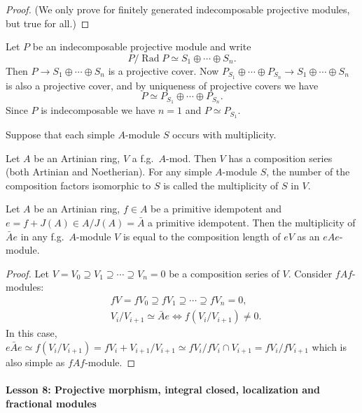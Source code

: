 \documentclass[11pt, a4paper]{report}
\begin{document}
\begin{proof}
(We only prove for finitely generated indecomposable projective modules, but true for all.)
\end{proof}
Let $P$ be an indecomposable projective module and write
\[
P / \operatorname{Rad} P \simeq S_{1} \oplus \cdots \oplus S_{n}.
\]
Then $P \rightarrow S_{1} \oplus \cdots \oplus S_{n}$ is a projective cover. Now $P_{S_{1}} \oplus \cdots \oplus P_{S_{n}} \rightarrow S_{1} \oplus \cdots \oplus S_{n}$ is also a projective cover, and by uniqueness of projective covers we have
\[
P \simeq P_{S_{1}} \oplus \cdots \oplus P_{S_{n}}.
\]
Since $P$ is indecomposable we have $n=1$ and $P \simeq P_{S_{1}}$.

Suppose that each simple $A$-module $S$ occurs with multiplicity.

Let $A$ be an Artinian ring, $V$ a f.g.\ $A$-mod. Then $V$ has a composition series (both Artinian and Noetherian). For any simple $A$-module $S$, the number of the composition factors isomorphic to $S$ is called the multiplicity of $S$ in $V$.

\begin{theorem}
Let $A$ be an Artinian ring, $f \in A$ be a primitive idempotent and $e=f+J(A) \in A / J(A)=\bar{A}$ a primitive idempotent. Then the multiplicity of $\bar{A} e$ in any f.g.\ $A$-module $V$ is equal to the composition length of $eV$ as an $eAe$-module.
\end{theorem}

\begin{proof}
Let $V=V_{0} \supseteq V_{1} \supseteq \cdots \supseteq V_{n}=0$ be a composition series of $V$. Consider $fAf$-modules:
\[
\begin{aligned}
& f V=f V_{0} \supseteq f V_{1} \supseteq \cdots \supseteq f V_{n}=0, \\
& V_{i} / V_{i+1} \simeq \bar{A} e \Leftrightarrow f\left(V_{i} / V_{i+1}\right) \neq 0.
\end{aligned}
\]
In this case, $e \bar{A} e \simeq f\left(V_{i} / V_{i+1}\right)=f V_{i}+V_{i+1} / V_{i+1} \simeq f V_{i} / f V_{i} \cap V_{i+1}=f V_{i} / f V_{i+1}$ which is also simple as $fAf$-module.
\end{proof}

\paragraph{Lesson 8: Projective morphism, integral closed, localization and fractional modules}
\end{document}
